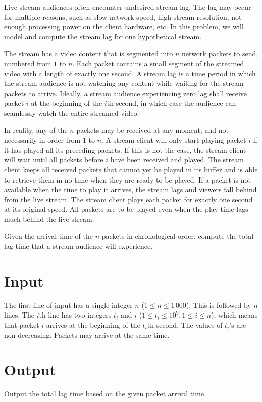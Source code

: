 
Live stream audiences often encounter undesired stream lag.
The lag may occur for multiple reasons, such as slow network speed, high stream resolution, not enough processing power on the client hardware, etc.
In this problem, we will model and compute the stream lag for one hypothetical stream.

The stream has a video content that is segmented into $n$ network packets to send, numbered from $1$ to $n$.
Each packet contains a small segment of the streamed video with a length of exactly one second.
A stream lag is a time period in which the stream audience is not watching any content while waiting for the stream packets to arrive.
Ideally, a stream audience experiencing zero lag shall receive packet $i$ at the beginning of the $i$th second,
in which case the audience can seamlessly watch the entire streamed video.

In reality, any of the $n$ packets may be received at any moment, and not necessarily in order from $1$ to $n$.
A stream client will only start playing packet $i$ if it has played all its preceding packets.
If this is not the case, the stream client will wait until all packets before $i$ have been received and played.
The stream client keeps all received packets that cannot yet be played in its buffer and is able to retrieve them in no time when they are ready to be played.
If a packet is not available when the time to play it arrives, the stream lags and viewers fall behind from the live stream.
The stream client plays each packet for exactly one second at its original speed.
All packets are to be played even when the play time lags much behind the live stream.

Given the arrival time of the $n$ packets in chronological order, compute the total lag time that a stream audience will experience.


\section*{Input}
The first line of input has a single integer $n$ ($1 \leq n \leq 1\,000$).
This is followed by $n$ lines.
The $i$th line has two integers $t_i$ and $i$ ($1 \leq t_i \leq 10^9, 1 \leq i \leq n$), which means that packet $i$ arrives at the beginning of the $t_i$th second.
The values of $t_i$'s are non-decreasing.
Packets may arrive at the same time.

\section*{Output}
Output the total lag time based on the given packet arrival time.
